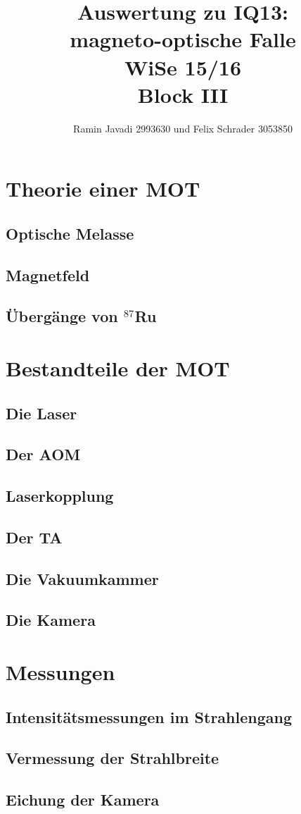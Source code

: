 \documentclass[12pt,a4paper]{article}
\title{Auswertung zu IQ13:\\
       magneto-optische Falle\\
       WiSe 15/16\\
       Block III}
\author{Ramin Javadi 2993630 und Felix Schrader 3053850}
\date{}
\begin{document}
\maketitle
\tableofcontents
\pagebreak
\section{Theorie einer MOT}
  \subsection{Optische Melasse}
  \subsection{Magnetfeld}
  \subsection{Übergänge von ${}^{87}$Ru}
\section{Bestandteile der MOT}
  \subsection{Die Laser}
  \subsection{Der AOM}
  \subsection{Laserkopplung}
  \subsection{Der TA}
  \subsection{Die Vakuumkammer}
  \subsection{Die Kamera}
\section{Messungen}
  \subsection{Intensitätsmessungen im Strahlengang}
  \subsection{Vermessung der Strahlbreite}
  \subsection{Eichung der Kamera}
\end{document}

